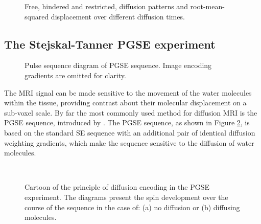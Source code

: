 \begin{figure}[ht]
 \centering
  \hspace*{0.01\textwidth}
  \caption{Free, hindered and restricted,  diffusion patterns and root-mean-squared displacement over different diffusion times.}
  \label{fig:chapter 2 types of diffusion}
\end{figure}

\subsection{The Stejskal-Tanner PGSE experiment}
\begin{figure}[ht]
\centering
{}
\caption{Pulse sequence diagram of PGSE sequence. Image encoding gradients are omitted for clarity.}
\label{fig:chapter2 pgse_diagram}
\end{figure}

The MRI signal can be made sensitive to the movement of the water molecules within the tissue, providing contrast about their molecular displacement on a sub-voxel scale. By far the most commonly used method for diffusion MRI is the {\gls{PGSE}} sequence, introduced by \citet{Stejskal:1965}. The {\gls{PGSE}} sequence, as shown in Figure \ref{fig:chapter2 pgse_diagram}, is based on the standard SE sequence with an additional pair of identical diffusion weighting gradients, which make the sequence sensitive to the diffusion of water molecules. 


\begin{figure}[phtb]
\centering
{}\\
\caption{Cartoon of the principle of diffusion encoding in the PGSE experiment. The diagrams present the spin development over the course of the sequence in the case of: (a) no diffusion or (b) diffusing molecules.}
\label{fig:chap2 diffusion illustration}
\end{figure}


